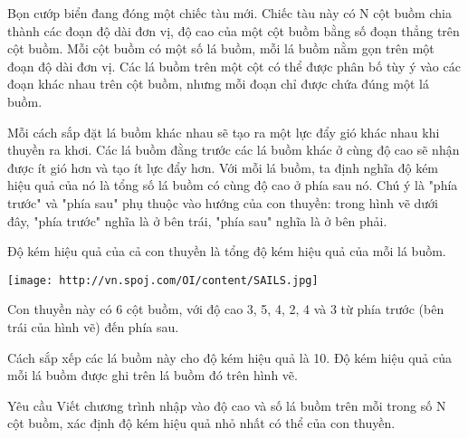 Bọn cướp biển đang đóng một chiếc tàu mới. Chiếc tàu này có N cột buồm chia thành các đoạn độ dài đơn vị, độ cao của một cột buồm bằng số đoạn thẳng trên cột buồm. Mỗi cột buồm có một số lá buồm, mỗi lá buồm nằm gọn trên một đoạn độ dài đơn vị. Các lá buồm trên một cột có thể được phân bố tùy ý vào các đoạn khác nhau trên cột buồm, nhưng mỗi đoạn chỉ được chứa đúng một lá buồm.  

   Mỗi cách sắp đặt lá buồm khác nhau sẽ tạo ra một lực đẩy gió khác nhau khi thuyền ra khơi. Các lá buồm đằng trước các lá buồm khác ở cùng độ cao sẽ nhận được ít gió hơn và tạo ít lực đẩy hơn. Với mỗi lá buồm, ta định nghĩa độ kém hiệu quả của nó là tổng số lá buồm có cùng độ cao ở phía sau nó. Chú ý là "phía trước" và "phía sau" phụ thuộc vào hướng của con thuyền: trong hình vẽ dưới đây, "phía trước" nghĩa là ở bên trái, "phía sau" nghĩa là ở bên phải.  

   Độ kém hiệu quả của cả con thuyền là tổng độ kém hiệu quả của mỗi lá buồm.  


\texttt{[image: http://vn.spoj.com/OI/content/SAILS.jpg]}

   Con thuyền này có 6 cột buồm, với độ cao 3, 5, 4, 2, 4 và 3 từ phía trước (bên trái của hình vẽ) đến phía sau.  

   Cách sắp xếp các lá buồm này cho độ kém hiệu quả là 10. Độ kém hiệu quả của mỗi lá buồm được ghi trên lá buồm đó trên hình vẽ.  

Yêu cầu
Viết chương trình nhập vào độ cao và số lá buồm trên mỗi trong số N cột buồm, xác định độ kém hiệu quả nhỏ nhất có thể của con thuyền.